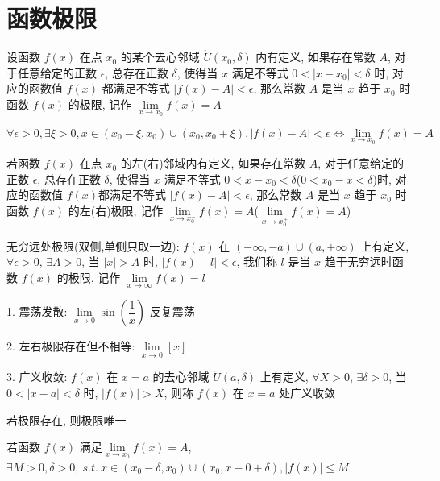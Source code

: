 \section{函数极限}
\begin{definition}[函数极限]
	设函数 $f(x)$ 在点 $x_{0}$ 的某个去心邻域 $\mathring{U}(x_{0},\delta)$ 内有定义, 如果存在常数 $A$, 对于任意给定的正数 $\epsilon$, 总存在正数 $\delta$, 
	使得当 $x$ 满足不等式 $0<|x-x_{0}|<\delta$ 时, 对应的函数值 $f(x)$ 都满足不等式 $|f(x)-A|<\epsilon$, 那么常数 $A$ 是当 $x$ 趋于 $x_{0}$ 时函数 $f(x)$ 的极限, 
	记作 $\lim\limits_{x\to x_{0}}f(x)=A$

	$$\forall \epsilon > 0, \exists \xi > 0, x\in (x_{0}-\xi,x_{0})\cup (x_{0},x_{0}+\xi), |f(x)-A| < \epsilon \Leftrightarrow \lim\limits_{x \to x_{0}}f(x) = A$$
\end{definition}

\begin{definition}[单侧极限]
	若函数 $f(x)$ 在点 $x_{0}$ 的左(右)邻域内有定义, 如果存在常数 $A$, 对于任意给定的正数 $\epsilon$, 总存在正数 $\delta$, 使得当 $x$ 满足不等式 $0<x-x_{0}<\delta$($0<x_{0}-x<\delta$)时, 对应的函数值 $f(x)$都满足不等式 $|f(x)-A|<\epsilon$, 那么常数 $A$ 是当 $x$ 趋于 $x_{0}$ 时函数 $f(x)$ 的左(右)极限, 记作 $\lim\limits_{x\to x_{0}^{-}}f(x)=A$($\lim\limits_{x\to x_{0}^{+}}f(x)=A$)
\end{definition}

\begin{definition}[无穷远极限]
	无穷远处极限(双侧,单侧只取一边): $f(x)$ 在 $(-\infty,-a)\cup(a,+\infty)$ 上有定义, $\forall \epsilon>0$, $\exists A>0$, 当 $|x|>A$ 时, $|f(x)-l|<\epsilon$, 我们称 $l$ 是当 $x$ 趋于无穷远时函数 $f(x)$ 的极限, 记作 $\lim\limits_{x\to\infty}f(x)=l$
\end{definition}
\begin{definition}[极限发散]
	1. 震荡发散: $\lim\limits_{x\to 0}\sin(\dfrac{1}{x})$ 反复震荡

	2. 左右极限存在但不相等: $\lim\limits_{x\to 0}[x]$

	3. 广义收敛: $f(x)$ 在 $x=a$ 的去心邻域 $\mathring{U}(a,\delta)$ 上有定义, $\forall X>0$, $\exists \delta>0$, 当 $0<|x-a|<\delta$ 时, $|f(x)|>X$, 则称 $f(x)$ 在 $x=a$ 处广义收敛
\end{definition}

\begin{property}[唯一性]
	若极限存在, 则极限唯一
\end{property}

\begin{property}[局部有界性]
	若函数 $f(x)$ 满足$\lim\limits_{x\to x_{0}}f(x)=A$, $\exists M > 0, \delta > 0,\ s.t.\ x\in(x_{0}-\delta,x_{0})\cup(x_{0},x-{0}+\delta), |f(x)|\leq M$
\end{property}

